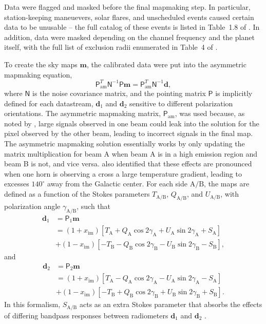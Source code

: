 \documentclass[twocolumn]{../../common/aa}
\newcommand{\A}[0]{\mathrm{A}}
\newcommand{\B}[0]{\mathrm{B}}
\begin{document}
Data were flagged and masked before the final mapmaking step. In particular, station-keeping maneuevers, solar flares, and unscheduled events caused certain data to be unusable -- the full catalog of these events is listed in Table~1.8 of \citet{wmapexsupp}. In addition, data were masked depending on the channel frequency and the planet itself, with the full list of exclusion radii enumerated in Table~4 of \citet{bennett2012}.

To create the sky maps $\boldsymbol m$, the calibrated data were put into the asymmetric mapmaking equation,
\begin{equation}
	\mathsf P_\mathrm{am}^T\mathsf N^{-1}\mathsf P\boldsymbol m=\mathsf P^T_\mathrm{am}\mathsf N^{-1}\boldsymbol d,
\end{equation}
where $\mathsf N$ is the noise covariance matrix, and the pointing matrix $\mathsf P$ is implicitly defined for each datastream, $\boldsymbol d_1$ and $\boldsymbol d_2$ sensitive to different polarization orientations. 
The asymmetric mapmaking matrix, $\mathsf P_\mathrm{am}$, was used because, as noted by \citet{jarosik2010}, large signals observed in one beam could leak into the solution for the pixel observed by the other beam, leading to incorrect signals in the final map. The asymmetric mapmaking solution essentially works by only updating the matrix multiplication for beam A when beam A is in a high emission region and beam B is not, and vice versa. \citet{bennett2012} also identified that these effects are pronounced when one horn is observing a cross a large temperature gradient, leading to excesses $140^\circ$ away from the Galactic center.
For each side $\A/\B$, the maps are defined as a function of the Stokes parameters $T_{\A/\B}$, $Q_{\A/\B}$, and $U_{\A/\B}$, with polarization angle $\gamma_{\A/\B}$, such that
\begin{align}
	\boldsymbol d_1&=\mathsf P_1\boldsymbol m
	\nonumber
	\\
	&=(1+x_\mathrm{im})[T_\A+Q_\A\cos2\gamma_\A+U_\A\sin2\gamma_\A+S_\A]
	\nonumber
	\\
	&+(1-x_\mathrm{im})[-T_\B-Q_\B\cos2\gamma_\B-U_\B\sin2\gamma_\B-S_\B],
\end{align}
and
\begin{align}
	\boldsymbol d_2&=\mathsf P_2\boldsymbol m
	\nonumber
	\\
	&=(1+x_\mathrm{im})[T_\A-Q_\A\cos2\gamma_\A-U_\A\sin2\gamma_\A-S_\A]
	\nonumber
	\\
	&+(1-x_\mathrm{im})[-T_\B+Q_\B\cos2\gamma_\B+U_\B\sin2\gamma_\B+S_\B].
\end{align}
In this formalism, $S_{\A/\B}$ acts as an extra Stokes parameter that absorbs the effects of differing bandpass responses between radiometers $\boldsymbol d_1$ and $\boldsymbol d_2$ \citep{jarosik2007}.
\end{document}
